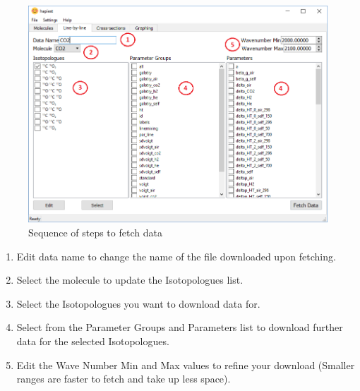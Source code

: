 \documentclass[12pt]{article}
\begin{document}
\begin{figure}[h]
\centering
\includegraphics[scale = 0.6]{hapiest_line_by_line_guide}
\caption{Sequence of steps to fetch data}
\label{fig:how_to_fetch}
\end{figure}

\begin{enumerate}
\item Edit data name to change the name of the file downloaded upon fetching.
\item Select the molecule to update the Isotopologues list.
\item Select the Isotopologues you want to download data for.
\item Select from the Parameter Groups and Parameters list to download further data for the selected Isotopologues.
\item Edit the Wave Number Min and Max values to refine your download (Smaller ranges are faster to fetch and take up less space).
\end{enumerate}
\end{document}
